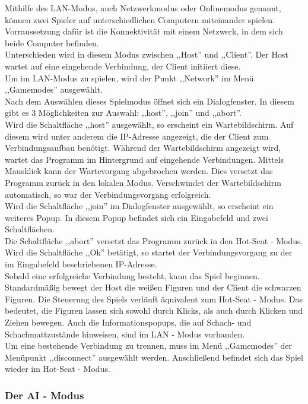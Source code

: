 \documentclass[12pt,a4paper]{article}
\begin{document}
Mithilfe des LAN-Modus, auch Netzwerkmodus oder Onlinemodus genannt, können zwei Spieler auf unterschiedlichen Computern miteinander spielen.\\
Vorraussetzung dafür ist die Konnektivität mit einem Netzwerk, in dem sich beide Computer befinden. \\
Unterschieden wird in diesem Modus zwischen ,,Host'' und ,,Client''. Der Host wartet auf eine eingehende Verbindung, der Client initiiert diese.\\
Um im LAN-Modus zu spielen, wird der Punkt ,,Network'' im Menü ,,Gamemodes'' ausgewählt.\\
Nach dem Auswählen dieses Spielmodus öffnet sich ein Dialogfenster. In diesem gibt es 3 Möglichkeiten zur Auswahl: ,,host'', ,,join'' und ,,abort''. \\
Wird die Schaltfläche ,,host'' ausgewählt, so erscheint ein Wartebildschirm. Auf diesem wird unter anderem die IP-Adresse angezeigt, die der Client zum Verbindungsaufbau benötigt. Während der Wartebildschirm angezeigt wird, wartet das Programm im Hintergrund auf eingehende Verbindungen. Mittels Mausklick kann der Wartevorgang abgebrochen werden. Dies versetzt das Programm zurück in den lokalen Modus. Verschwindet der Wartebildschirm automatisch, so war der Verbindungsvorgang erfolgreich. \\
Wird die Schaltfläche ,,join'' im Dialogfenster ausgewählt, so erscheint ein weiteres Popup. In diesem Popup befindet sich ein Eingabefeld und zwei Schaltflächen.\\
Die Schaltfläche ,,abort'' versetzt das Programm zurück in den Hot-Seat - Modus.\\
Wird die Schaltfläche ,,Ok'' betätigt, so startet der Verbindungsvorgang zu der im Eingabefeld beschriebenen IP-Adresse.\\[2ex]
Sobald eine erfolgreiche Verbindung besteht, kann das Spiel beginnen. Standardmäßig bewegt der Host die weißen Figuren und der Client die schwarzen Figuren. Die Steuerung des Spiels verläuft äquivalent zum Hot-Seat - Modus. Das bedeutet, die Figuren lassen sich sowohl durch Klicks, als auch durch Klicken und Ziehen bewegen. Auch die Informationspopups, die auf Schach- und Schachmattzustände hinweisen, sind im LAN - Modus vorhanden.\\
Um eine bestehende Verbindung zu trennen, muss im Menü ,,Gamemodes'' der Menüpunkt ,,disconnect'' ausgewählt werden. Anschließend befindet sich das Spiel wieder im Hot-Seat - Modus. 

	\subsubsection{Der AI - Modus}
	\label{SUBSUBSEC:USERDOCAI}
	
\end{document}
